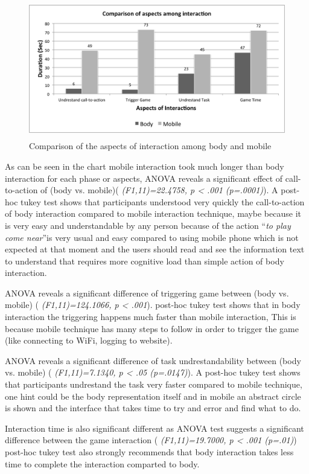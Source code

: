 \begin{figure}[H]
\centering
\includegraphics[width=12cm,height=6cm]{Figures/6/mobile_body_aspect}%
 \caption{Comparison of the aspects of interaction among body and mobile }%
 \label{fig:mobile_body_aspect}%
\end{figure}


As can be seen in the chart mobile interaction took much longer than body interaction for each phase or aspects, ANOVA reveals a significant effect of call-to-action of (body vs. mobile)( \emph{(F1,11)=22.4758, p < .001 (p=.0001)}). A post-hoc tukey test shows that participants understood very quickly the call-to-action of body interaction compared to mobile interaction technique, maybe because it is very easy and understandable by any person because of the action ``\emph{to play come near}''is very usual and easy compared to using mobile phone which is not expected at that moment and the users should read and see the information text to understand that requires more cognitive load than simple action of body interaction.

ANOVA reveals a significant difference of triggering game between (body vs. mobile) ( \emph{(F1,11)=124.1066, p < .001}). post-hoc tukey test shows that in body interaction the triggering happens much faster than mobile interaction, This is because mobile technique has many steps to follow in order to trigger the game (like connecting to WiFi, logging to website).


ANOVA reveals a significant difference of task undrestandability between (body vs. mobile) ( \emph{(F1,11)=7.1340, p < .05 (p=.0147)}). A post-hoc tukey test shows that participants undrestand the task very faster compared to mobile technique, one hint could be the body representation itself and in mobile an abstract circle is shown and the interface that takes time to try and error and find what to do.

Interaction time is also significant different as ANOVA test suggests a significant difference between the game interaction ( \emph{(F1,11)=19.7000, p < .001 (p=.01)}) post-hoc tukey test also strongly recommends that body interaction takes less time to complete the interaction comparted to body.

